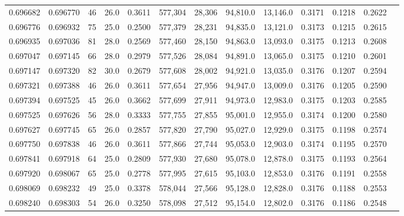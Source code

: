 \begin{tabular}{rrrrrrrrrrrrr}
0.696682 & 0.696770 &    46 & 26.0 &                                     0.3611 & 577,304 &  28,306 &  94,810.0 &  13,146.0 & 0.3171 & 0.1218 & 0.2622 \\
0.696776 & 0.696932 &    75 & 25.0 &                                     0.2500 & 577,379 &  28,231 &  94,835.0 &  13,121.0 & 0.3173 & 0.1215 & 0.2615 \\
0.696935 & 0.697036 &    81 & 28.0 &                                     0.2569 & 577,460 &  28,150 &  94,863.0 &  13,093.0 & 0.3175 & 0.1213 & 0.2608 \\
0.697047 & 0.697145 &    66 & 28.0 &                                     0.2979 & 577,526 &  28,084 &  94,891.0 &  13,065.0 & 0.3175 & 0.1210 & 0.2601 \\
0.697147 & 0.697320 &    82 & 30.0 &                                     0.2679 & 577,608 &  28,002 &  94,921.0 &  13,035.0 & 0.3176 & 0.1207 & 0.2594 \\
0.697321 & 0.697388 &    46 & 26.0 &                                     0.3611 & 577,654 &  27,956 &  94,947.0 &  13,009.0 & 0.3176 & 0.1205 & 0.2590 \\
0.697394 & 0.697525 &    45 & 26.0 &                                     0.3662 & 577,699 &  27,911 &  94,973.0 &  12,983.0 & 0.3175 & 0.1203 & 0.2585 \\
0.697525 & 0.697626 &    56 & 28.0 &                                     0.3333 & 577,755 &  27,855 &  95,001.0 &  12,955.0 & 0.3174 & 0.1200 & 0.2580 \\
0.697627 & 0.697745 &    65 & 26.0 &                                     0.2857 & 577,820 &  27,790 &  95,027.0 &  12,929.0 & 0.3175 & 0.1198 & 0.2574 \\
0.697750 & 0.697838 &    46 & 26.0 &                                     0.3611 & 577,866 &  27,744 &  95,053.0 &  12,903.0 & 0.3174 & 0.1195 & 0.2570 \\
0.697841 & 0.697918 &    64 & 25.0 &                                     0.2809 & 577,930 &  27,680 &  95,078.0 &  12,878.0 & 0.3175 & 0.1193 & 0.2564 \\
0.697920 & 0.698067 &    65 & 25.0 &                                     0.2778 & 577,995 &  27,615 &  95,103.0 &  12,853.0 & 0.3176 & 0.1191 & 0.2558 \\
0.698069 & 0.698232 &    49 & 25.0 &                                     0.3378 & 578,044 &  27,566 &  95,128.0 &  12,828.0 & 0.3176 & 0.1188 & 0.2553 \\
0.698240 & 0.698303 &    54 & 26.0 &                                     0.3250 & 578,098 &  27,512 &  95,154.0 &  12,802.0 & 0.3176 & 0.1186 & 0.2548 \\

\end{tabular}
